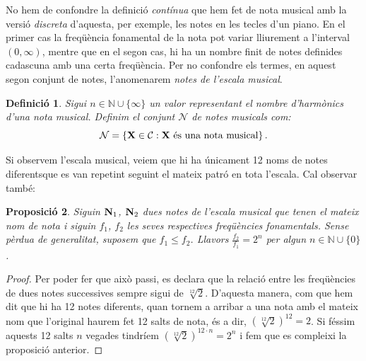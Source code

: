 \documentclass{article}
\theoremstyle{math}
\newtheorem{definition}{Definició}[section]
\newtheorem{prop}[definition]{Proposició}
\theoremstyle{TheoremNum}
\newcommand{\0}{\ensuremath{\vb{0}}}
\newcommand{\N}{\ensuremath{\vb{N}}}
\newcommand{\X}{\ensuremath{\vb{X}}}
\newcommand{\NN}{\ensuremath{\mathbb{N}}} %
\begin{document}
\noindent No hem de confondre la definició \textit{contínua} que hem fet de nota musical amb la versió \textit{discreta} d'aquesta, per exemple, les notes en les tecles d'un piano. En el primer cas la freqüència fonamental de la nota pot variar lliurement a l'interval $(0,\infty)$, mentre que en el segon cas, hi ha un nombre finit de notes definides cadascuna amb una certa freqüència. Per no confondre els termes, en aquest segon conjunt de notes, l'anomenarem \textit{notes de l'escala musical}.
\begin{definition}
    Sigui $n\in\NN\cup\{\infty\}$ un valor representant el nombre d'harmònics d'una nota musical. Definim el conjunt $\mathcal{N}$ de notes musicals com: $$\mathcal{N}=\left\{\X\in\mathcal{C}:\X\text{ és una nota musical}\right\}.$$
\end{definition}
\noindent Si observem l'escala musical, veiem que hi ha únicament 12 noms de notes diferents\footnotemark\space que es van repetint seguint el mateix patró en tota l'escala. Cal observar també:
\begin{prop}
  Siguin $\N_1$, $\N_2$ dues notes de l'escala musical que tenen el mateix nom de nota i siguin $f_1$, $f_2$ les seves respectives freqüències fonamentals. Sense pèrdua de generalitat, suposem que $f_1 \leq f_2$. Llavors $\frac{f_{2}}{f_{1}} = 2^n$ per algun $n \in \mathbb{N}\cup\{0\}$.
\end{prop}
\begin{proof}
    Per poder fer que això passi, es declara que la relació entre les freqüències de dues notes successives sempre sigui de $\sqrt[12]{2}$\footnotemark. D'aquesta manera, com que hem dit que hi ha 12 notes diferents, quan tornem a arribar a una nota amb el mateix nom que l'original haurem fet 12 salts de nota, és a dir, $\left(\sqrt[12]{2}\right)^{12} = 2$. Si féssim aquests 12 salts $n$ vegades tindríem ${\left(\sqrt[12]{2}\right)}^{12\cdot n} = 2^n$ i fem que es compleixi la proposició anterior. 
\end{proof}
\end{document}
